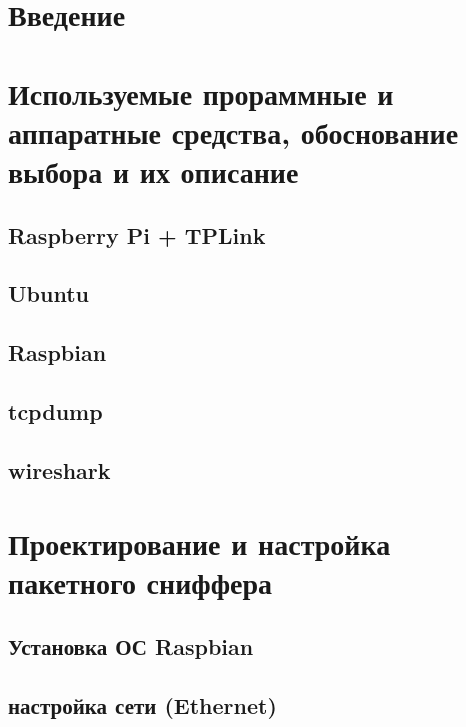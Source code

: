 






\newpage
{}
\tableofcontents

\newpage
{}
\setcounter{section}{0}
\section*{Введение}


\newpage
{}
\section{Используемые прораммные и аппаратные средства, обоснование выбора и их описание}
\setcounter{figure}{0}
\subsection{Raspberry Pi + TPLink}
%
\subsection{Ubuntu}
%
\subsection{Raspbian}
%
\subsection{tcpdump}
%
\subsection{wireshark}
%


\newpage
{}
\section{Проектирование и настройка пакетного сниффера}
\setcounter{figure}{0}
\subsection{Установка ОС Raspbian}

\subsection{настройка сети (Ethernet)}


